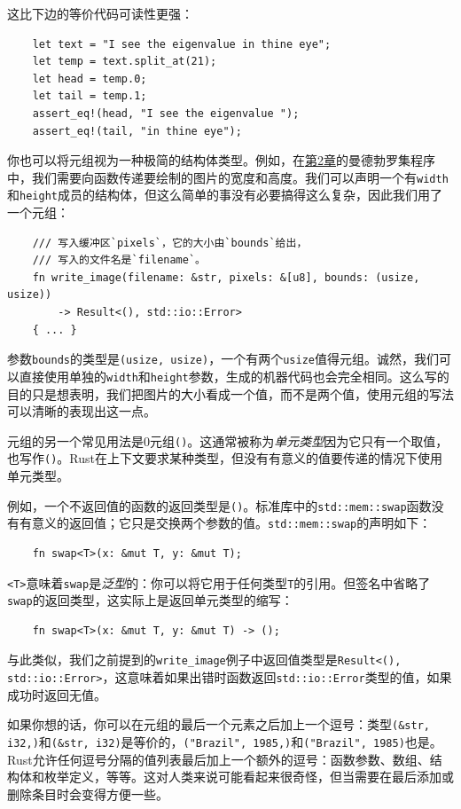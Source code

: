 这比下边的等价代码可读性更强：
\begin{verbatim}
    let text = "I see the eigenvalue in thine eye";
    let temp = text.split_at(21);
    let head = temp.0;
    let tail = temp.1;
    assert_eq!(head, "I see the eigenvalue ");
    assert_eq!(tail, "in thine eye");
\end{verbatim}

你也可以将元组视为一种极简的结构体类型。例如，在\hyperref[ch02]{第2章}的曼德勃罗集程序中，我们需要向函数传递要绘制的图片的宽度和高度。我们可以声明一个有\texttt{width}和\texttt{height}成员的结构体，但这么简单的事没有必要搞得这么复杂，因此我们用了一个元组：
\begin{verbatim}
    /// 写入缓冲区`pixels`，它的大小由`bounds`给出，
    /// 写入的文件名是`filename`。
    fn write_image(filename: &str, pixels: &[u8], bounds: (usize, usize))
        -> Result<(), std::io::Error>
    { ... }
\end{verbatim}

参数\texttt{bounds}的类型是\texttt{(usize, usize)}，一个有两个\texttt{usize}值得元组。诚然，我们可以直接使用单独的\texttt{width}和\texttt{height}参数，生成的机器代码也会完全相同。这么写的目的只是想表明，我们把图片的大小看成一个值，而不是两个值，使用元组的写法可以清晰的表现出这一点。

元组的另一个常见用法是0元组\texttt{()}。这通常被称为\emph{单元类型}因为它只有一个取值，也写作\texttt{()}。Rust在上下文要求某种类型，但没有有意义的值要传递的情况下使用单元类型。

例如，一个不返回值的函数的返回类型是\texttt{()}。标准库中的\texttt{std::mem::swap}函数没有有意义的返回值；它只是交换两个参数的值。\texttt{std::mem::swap}的声明如下：
\begin{verbatim}
    fn swap<T>(x: &mut T, y: &mut T);
\end{verbatim}
\texttt{<T>}意味着\texttt{swap}是\emph{泛型}的：你可以将它用于任何类型\texttt{T}的引用。但签名中省略了\texttt{swap}的返回类型，这实际上是返回单元类型的缩写：
\begin{verbatim}
    fn swap<T>(x: &mut T, y: &mut T) -> ();
\end{verbatim}

与此类似，我们之前提到的\texttt{write\_image}例子中返回值类型是\texttt{Result<(), std::io::Error>}，这意味着如果出错时函数返回\texttt{std::io::Error}类型的值，如果成功时返回无值。

如果你想的话，你可以在元组的最后一个元素之后加上一个逗号：类型\texttt{(\&str, i32,)}和\texttt{(\&str, i32)}是等价的，\texttt{("Brazil", 1985,)}和\texttt{("Brazil", 1985)}也是。Rust允许任何逗号分隔的值列表最后加上一个额外的逗号：函数参数、数组、结构体和枚举定义，等等。这对人类来说可能看起来很奇怪，但当需要在最后添加或删除条目时会变得方便一些。

